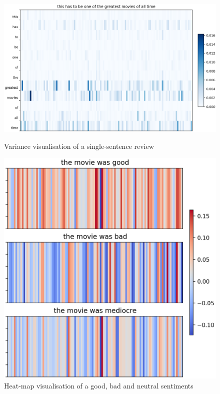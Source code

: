 \documentclass[12pt]{article}
\begin{document}
\begin{multicols}{2}
\begin{figure}[t]
    \centering
    \begin{minipage}{0.49\textwidth}
       \centering
       \includegraphics[width=1\textwidth]{figs/greatest.png}
       \caption{Variance visualisation of a single-sentence review}
       \label{figure:greatest}
    \end{minipage}\hfill
    \begin{minipage}{0.49\textwidth}
       \centering
       \includegraphics[width=1\textwidth]{figs/goodbad.png}
       \caption{Heat-map visualisation of a good, bad and neutral sentiments}
       \label{figure:goodbad}
    \end{minipage}
\end{figure}


\end{multicols}
\end{document}
